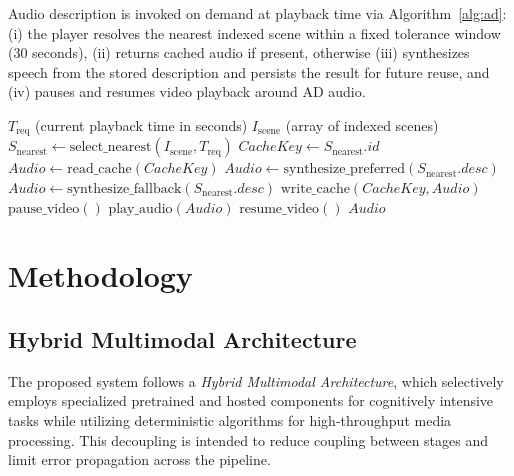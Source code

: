 \documentclass[conference]{IEEEtran}
\begin{document}
Audio description is invoked on demand at playback time via Algorithm~\ref{alg:ad}: (i) the player resolves the nearest indexed scene within a fixed tolerance window (30 seconds), (ii) returns cached audio if present, otherwise (iii) synthesizes speech from the stored description and persists the result for future reuse, and (iv) pauses and resumes video playback around AD audio.

\begin{algorithm}[!t]
\caption{On-Demand Audio Description Resolution}
\label{alg:ad}
\begin{algorithmic}[1]
\Require $T_{\text{req}}$ (current playback time in seconds)
\Require $I_{\text{scene}}$ (array of indexed scenes)
\State $S_{\text{nearest}} \gets \text{select\_nearest}(I_{\text{scene}}, T_{\text{req}})$
    \State \Return {}
\EndIf
\State $CacheKey \gets S_{\text{nearest}}.id$
    \State $Audio \gets \text{read\_cache}(CacheKey)$
\Else
        \State $Audio \gets \text{synthesize\_preferred}(S_{\text{nearest}}.desc)$
    \Else
        \State $Audio \gets \text{synthesize\_fallback}(S_{\text{nearest}}.desc)$
    \EndIf
    \State $\text{write\_cache}(CacheKey, Audio)$
\EndIf
\State $\text{pause\_video}()$
\State $\text{play\_audio}(Audio)$
\State $\text{resume\_video}()$
\State \Return $Audio$
\end{algorithmic}
\end{algorithm}

\section{Methodology}
\subsection{Hybrid Multimodal Architecture}
The proposed system follows a \emph{Hybrid Multimodal Architecture}, which selectively employs specialized pretrained and hosted components for cognitively intensive tasks while utilizing deterministic algorithms for high-throughput media processing. This decoupling is intended to reduce coupling between stages and limit error propagation across the pipeline.
\end{document}
